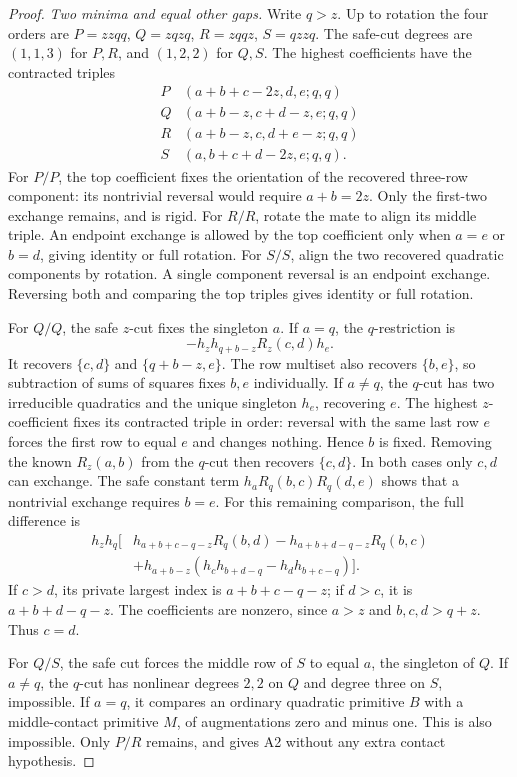 \documentclass[11pt,a4paper]{amsart}
\numberwithin{equation}{section}
\theoremstyle{plain}
\theoremstyle{definition}
\begin{document}
\begin{proof}
\emph{Two minima and equal other gaps.}
Write \(q>z\).  Up to rotation the four orders are
\(P=zzqq\), \(Q=zqzq\), \(R=zqqz\), \(S=qzzq\).
The safe-cut degrees are \((1,1,3)\) for \(P,R\), and
\((1,2,2)\) for \(Q,S\).  The highest coefficients have the
contracted triples
\[
\begin{array}{c|c}
P&(a+b+c-2z,d,e;q,q)\\
Q&(a+b-z,c+d-z,e;q,q)\\
R&(a+b-z,c,d+e-z;q,q)\\
S&(a,b+c+d-2z,e;q,q).
\end{array}
\]
For \(P/P\), the top coefficient fixes the orientation of the recovered
three-row component: its nontrivial reversal would require
\(a+b=2z\).  Only the first-two exchange remains, and is rigid.
For \(R/R\), rotate the mate to align its middle triple.  An endpoint
exchange is allowed by the top coefficient only when \(a=e\) or
\(b=d\), giving identity or full rotation.
For \(S/S\), align the two recovered quadratic components by rotation.
A single component reversal is an endpoint exchange.  Reversing both
and comparing the top triples gives identity or full rotation.

For \(Q/Q\), the safe \(z\)-cut fixes the singleton \(a\).
If \(a=q\), the \(q\)-restriction is
\[
 -h_zh_{q+b-z}R_z(c,d)h_e.
\]
It recovers \(\{c,d\}\) and \(\{q+b-z,e\}\).  The row multiset
also recovers \(\{b,e\}\), so subtraction of sums of squares fixes
\(b,e\) individually.
If \(a\ne q\), the \(q\)-cut has two irreducible quadratics and the
unique singleton \(h_e\), recovering \(e\).  The highest
\(z\)-coefficient fixes its contracted triple in order: reversal
with the same last row \(e\) forces the first row to equal \(e\)
and changes nothing.  Hence \(b\) is fixed.  Removing the known
\(R_z(a,b)\) from the \(q\)-cut then recovers \(\{c,d\}\).
In both cases only \(c,d\) can exchange.  The safe constant term
\(h_aR_q(b,c)R_q(d,e)\) shows that a nontrivial exchange requires
\(b=e\).  For this remaining comparison, the full difference is
\begin{align*}
 h_zh_q\bigl[&h_{a+b+c-q-z}R_q(b,d)
             -h_{a+b+d-q-z}R_q(b,c)\\
 &+h_{a+b-z}(h_ch_{b+d-q}-h_dh_{b+c-q})\bigr].
\end{align*}
If \(c>d\), its private largest index is \(a+b+c-q-z\); if
\(d>c\), it is \(a+b+d-q-z\).  The coefficients are nonzero,
since \(a>z\) and \(b,c,d>q+z\).  Thus \(c=d\).

For \(Q/S\), the safe cut forces the middle row of \(S\) to equal
\(a\), the singleton of \(Q\).  If \(a\ne q\), the \(q\)-cut
has nonlinear degrees \(2,2\) on \(Q\) and degree three on \(S\),
impossible.  If \(a=q\), it compares an ordinary quadratic primitive
\(B\) with a middle-contact primitive \(M\), of augmentations zero
and minus one.  This is also impossible.
Only \(P/R\) remains, and  gives A2 without
any extra contact hypothesis.


\end{proof}
\end{document}
